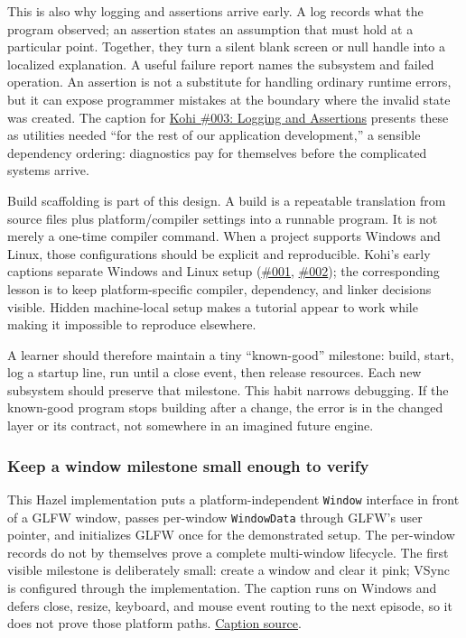 This is also why logging and assertions arrive early. A log records what the program observed; an assertion states an assumption that must hold at a particular point. Together, they turn a silent blank screen or null handle into a localized explanation. A useful failure report names the subsystem and failed operation. An assertion is not a substitute for handling ordinary runtime errors, but it can expose programmer mistakes at the boundary where the invalid state was created. The caption for \href{https://www.youtube.com/watch?v=l9e8PJskYnI}{Kohi \#003: Logging and Assertions} presents these as utilities needed ``for the rest of our application development,'' a sensible dependency ordering: diagnostics pay for themselves before the complicated systems arrive.

Build scaffolding is part of this design. A build is a repeatable translation from source files plus platform/compiler settings into a runnable program. It is not merely a one-time compiler command. When a project supports Windows and Linux, those configurations should be explicit and reproducible. Kohi's early captions separate Windows and Linux setup (\href{https://www.youtube.com/watch?v=F6_WdnzQIQ4}{\#001}, \href{https://www.youtube.com/watch?v=NIv1mygBOcg}{\#002}); the corresponding lesson is to keep platform-specific compiler, dependency, and linker decisions visible. Hidden machine-local setup makes a tutorial appear to work while making it impossible to reproduce elsewhere.

A learner should therefore maintain a tiny ``known-good'' milestone: build, start, log a startup line, run until a close event, then release resources. Each new subsystem should preserve that milestone. This habit narrows debugging. If the known-good program stops building after a change, the error is in the changed layer or its contract, not somewhere in an imagined future engine.

\subsubsection{Keep a window milestone small enough to verify}\label{05-engine-i-ch013-keep-a-window-milestone-small-enough-to-verify}

This Hazel implementation puts a platform-independent \texttt{Window} interface in front of a GLFW window, passes per-window \texttt{WindowData} through GLFW's user pointer, and initializes GLFW once for the demonstrated setup. The per-window records do not by themselves prove a complete multi-window lifecycle. The first visible milestone is deliberately small: create a window and clear it pink; VSync is configured through the implementation. The caption runs on Windows and defers close, resize, keyboard, and mouse event routing to the next episode, so it does not prove those platform paths. \href{https://www.youtube.com/watch?v=88dmtleVywk}{Caption source}.

